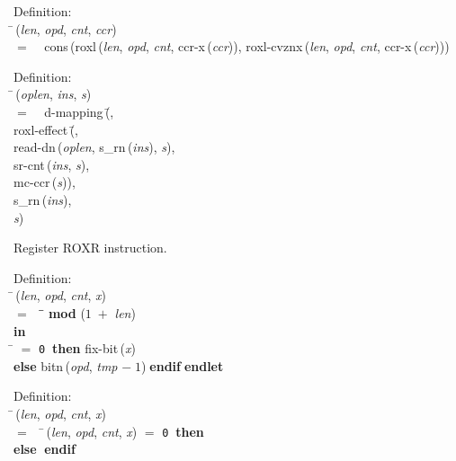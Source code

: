 \begin{tabbing}{\sc Definition}: \\  
\=\,({\it{len\/}}, {\it{opd\/}}, {\it{cnt\/}}, {\it{ccr\/}}) \\ 
$=$$\;\;\;\;${\rm{cons}}\,({\rm{roxl}}\,({\it{len\/}}, {\it{opd\/}}, {\it{cnt\/}}, {\rm{ccr-x}}\,({\it{ccr\/}})), {\rm{roxl-cvznx}}\,({\it{len\/}}, {\it{opd\/}}, {\it{cnt\/}}, {\rm{ccr-x}}\,({\it{ccr\/}})))\-
\end{tabbing}

\begin{tabbing}{\sc Definition}: \\  
\=\,({\it{oplen\/}}, {\it{ins\/}}, {\it{s\/}}) \\ 
$=$$\;\;\;\;${\rm{d-mapping}}\,(\=, \\ 
{\rm{roxl-effect}}\,(\=, \\ 
{\rm{read-dn}}\,({\it{oplen\/}}, {\rm{s\_rn}}\,({\it{ins\/}}), {\it{s\/}}), \\ 
{\rm{sr-cnt}}\,({\it{ins\/}}, {\it{s\/}}), \\ 
{\rm{mc-ccr}}\,({\it{s\/}}))\-, \\ 
{\rm{s\_rn}}\,({\it{ins\/}}), \\ 
{\it{s\/}})\-\-
\end{tabbing}

 Register ROXR instruction.
\begin{tabbing}{\sc Definition}: \\  
\=\,({\it{len\/}}, {\it{opd\/}}, {\it{cnt\/}}, {\it{x\/}}) \\ 
$=$$\;\;\;\;$\=\= ${}${\bf{mod}}${}$ ($1\;+$ {\it{len\/}})\- \\ 
{\bf in} \\ 
\= $=$ {\tt{0}}$\;\;${\bf then }{\rm{fix-bit}}\,({\it{x\/}}) \\ 
{\bf else }{\rm{bitn}}\,({\it{opd\/}}, {\it{tmp\/}} $-\;1$)$\;${\bf  endif}\-$\;${\bf  endlet}\-\-
\end{tabbing}

\begin{tabbing}{\sc Definition}: \\  
\=\,({\it{len\/}}, {\it{opd\/}}, {\it{cnt\/}}, {\it{x\/}}) \\ 
$=$$\;\;\;\;$\=\,({\it{len\/}}, {\it{opd\/}}, {\it{cnt\/}}, {\it{x\/}}) $=$ {\tt{0}}$\;\;${\bf then }{} \\ 
{\bf else }{}$\;${\bf  endif}\-\-
\end{tabbing}

